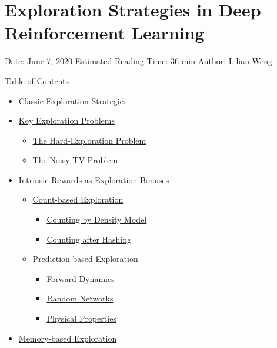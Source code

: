 \section{Exploration Strategies in Deep Reinforcement Learning}\label{exploration-strategies-in-deep-reinforcement-learning}

Date: June 7, 2020 \textbar{} Estimated Reading Time: 36 min \textbar{} Author: Lilian Weng

{Table of Contents}

\begin{itemize}
\tightlist
\item
  \hyperref[classic-exploration-strategies]{Classic Exploration Strategies}
\item
  \hyperref[key-exploration-problems]{Key Exploration Problems}

  \begin{itemize}
  \tightlist
  \item
    \hyperref[the-hard-exploration-problem]{The Hard-Exploration Problem}
  \item
    \hyperref[the-noisy-tv-problem]{The Noisy-TV Problem}
  \end{itemize}
\item
  \hyperref[intrinsic-rewards-as-exploration-bonuses]{Intrinsic Rewards as Exploration Bonuses}

  \begin{itemize}
  \tightlist
  \item
    \hyperref[count-based-exploration]{Count-based Exploration}

    \begin{itemize}
    \tightlist
    \item
      \hyperref[counting-by-density-model]{Counting by Density Model}
    \item
      \hyperref[counting-after-hashing]{Counting after Hashing}
    \end{itemize}
  \item
    \hyperref[prediction-based-exploration]{Prediction-based Exploration}

    \begin{itemize}
    \tightlist
    \item
      \hyperref[forward-dynamics]{Forward Dynamics}
    \item
      \hyperref[random-networks]{Random Networks}
    \item
      \hyperref[physical-properties]{Physical Properties}
    \end{itemize}
  \end{itemize}
\item
  \hyperref[memory-based-exploration]{Memory-based Exploration}


\end{itemize}

